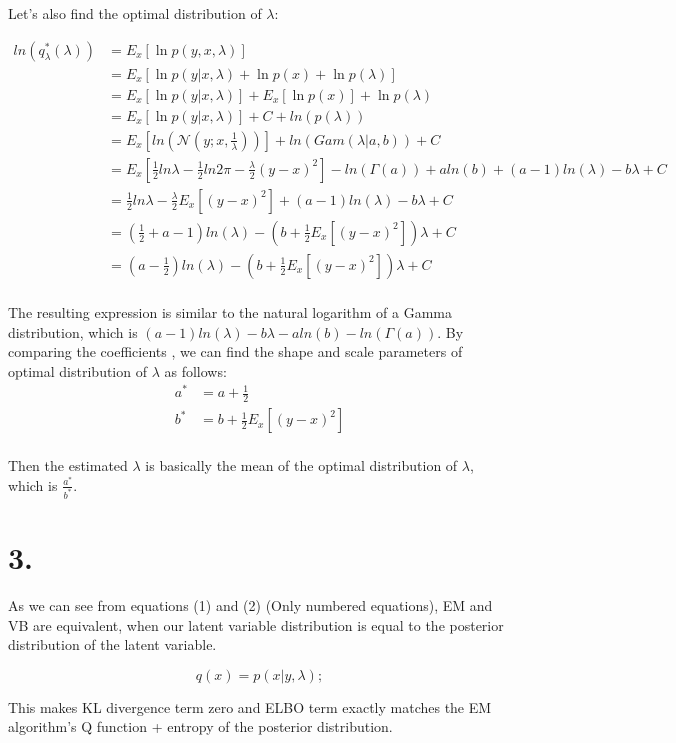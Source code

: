 \documentclass{article}
\begin{document}
Let's also find the optimal distribution of $\lambda$:

\[
    \begin{aligned}
        ln(q_\lambda^*(\lambda)) &= E_{x}\left[ \ln p(y,x,\lambda) \right] \\
                     &= E_{x}\left[ \ln p(y|x,\lambda) + \ln p(x) + \ln p(\lambda) \right] \\
                        &= E_{x}\left[ \ln p(y|x,\lambda) \right] + E_{x}\left[ \ln p(x) \right] + \ln p(\lambda) \\
                        &= E_{x}\left[ \ln p(y|x,\lambda) \right] + C + ln(p(\lambda))\\
                        &= E_{x}\left[ ln(\mathcal{N}(y;x,\frac{1}{\lambda}))\right] + ln(Gam(\lambda|a,b)) + C\\
                        &= E_{x}\left[ \frac{1}{2} ln \lambda - \frac{1}{2} ln 2\pi - \frac{\lambda}{2}(y-x)^2\right] - ln(\Gamma(a)) + a ln(b) + (a-1)ln(\lambda) - b\lambda + C\\
                        &= \frac{1}{2} ln \lambda - \frac{\lambda}{2} E_{x}\left[ (y-x)^2\right] + (a-1)ln(\lambda) - b\lambda + C\\
                        &= \left(\frac{1}{2} + a - 1\right)ln(\lambda) - \left(b + \frac{1}{2} E_{x}\left[ (y-x)^2\right]\right)\lambda + C \\
                        &= \left(a - \frac{1}{2}\right)ln(\lambda) - \left(b + \frac{1}{2} E_{x}\left[ (y-x)^2\right]\right)\lambda + C \\
    \end{aligned}
\]

The resulting expression is similar to the natural logarithm of a Gamma distribution, which is $(a-1)ln(\lambda) - b\lambda - a ln(b) - ln(\Gamma(a))$. By comparing the coefficients
, we can find the shape and scale parameters of optimal distribution of $\lambda$ as follows:
\[
    \begin{aligned}
        a^* &= a + \frac{1}{2} \\
        b^* &= b + \frac{1}{2} E_{x}\left[ (y-x)^2\right] \\
    \end{aligned}
\]  

Then the estimated $\lambda$ is basically the mean of the optimal distribution of $\lambda$, which is $\frac{a^*}{b^*}$.

\section*{3.}

As we can see from equations (1) and (2) (Only numbered equations), EM and VB are equivalent, when our latent variable distribution is 
equal to the posterior distribution of the latent variable. 

\[ 
    q(x) = p(x|y,\lambda);
\]

This makes KL divergence term zero and ELBO term exactly matches the EM algorithm's Q function + entropy of the posterior distribution.
\end{document}
